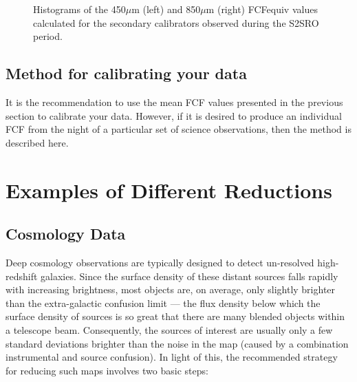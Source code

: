 \documentclass[twoside,11pt]{article}
\newcommand{\xref}[3]{#1}
\newcommand{\xlabel}[1]{}
\renewcommand{\_}{\texttt{\symbol{95}}}
\newcommand{\task}[1]{\textsf{#1}}
\newcommand{\cmult}{\xref{\task{cmult}}{sun95}{CMULT}}
\begin{document}
\begin{figure}
\begin{center}
\caption{Histograms of the 450$\mu$m (left) and 850$\mu$m (right) FCF\_equiv values calculated for the secondary calibrators observed during the S2SRO period.}
\label{fig:fcfs}
\end{center}
\end{figure}

\subsection{Method for calibrating your data}


It is the recommendation to use the mean FCF values presented in the
previous section to calibrate your data. However, if it is desired to
produce an individual FCF from the night of a particular set of
science observations, then the method is described here.


\section{\xlabel{Examples}Examples of Different Reductions}
\label{sec:eg}

\subsection{\xlabel{Cosmology}Cosmology Data}
\label{sec:cosmology}

Deep cosmology observations are typically designed to detect
un-resolved high-redshift galaxies. Since the surface density of these
distant sources falls rapidly with increasing brightness, most objects
are, on average, only slightly brighter than the extra-galactic
confusion limit --- the flux density below which the surface density
of sources is so great that there are many blended objects within a
telescope beam. Consequently, the sources of interest are usually only
a few standard deviations brighter than the noise in the map (caused
by a combination instrumental and source confusion). In light of this,
the recommended strategy for reducing such maps involves two basic
steps:
\end{document}
